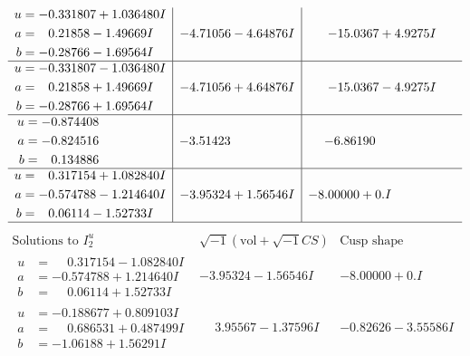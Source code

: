 \documentclass[1p]{elsarticle_modified}
\theoremstyle{definition}
\newcommand{\I}{\sqrt{-1}}
\begin{document}
$$\begin{array}{c|c|c}
\begin{aligned}
u &= -0.331807 + 1.036480 I \\
a &= \phantom{-}0.21858 - 1.49669 I \\
b &= -0.28766 - 1.69564 I\end{aligned}
 & -4.71056 - 4.64876 I & -15.0367 + 4.9275 I \\ \hline\begin{aligned}
u &= -0.331807 - 1.036480 I \\
a &= \phantom{-}0.21858 + 1.49669 I \\
b &= -0.28766 + 1.69564 I\end{aligned}
 & -4.71056 + 4.64876 I & -15.0367 - 4.9275 I \\ \hline\begin{aligned}
u &= -0.874408\phantom{ +0.000000I} \\
a &= -0.824516\phantom{ +0.000000I} \\
b &= \phantom{-}0.134886\phantom{ +0.000000I}\end{aligned}
 & -3.51423\phantom{ +0.000000I} & -6.86190\phantom{ +0.000000I} \\ \hline\begin{aligned}
u &= \phantom{-}0.317154 + 1.082840 I \\
a &= -0.574788 - 1.214640 I \\
b &= \phantom{-}0.06114 - 1.52733 I\end{aligned}
 & -3.95324 + 1.56546 I & -8.00000 + 0. I\phantom{ +0.000000I}\\
 \hline 
 \end{array}$$\newpage$$\begin{array}{c|c|c}  
\text{Solutions to }I^u_{2}& \I (\text{vol} + \sqrt{-1}CS) & \text{Cusp shape}\\
 \hline 
\begin{aligned}
u &= \phantom{-}0.317154 - 1.082840 I \\
a &= -0.574788 + 1.214640 I \\
b &= \phantom{-}0.06114 + 1.52733 I\end{aligned}
 & -3.95324 - 1.56546 I & -8.00000 + 0. I\phantom{ +0.000000I} \\ \hline\begin{aligned}
u &= -0.188677 + 0.809103 I \\
a &= \phantom{-}0.686531 + 0.487499 I \\
b &= -1.06188 + 1.56291 I\end{aligned}
 & \phantom{-}3.95567 - 1.37596 I & -0.82626 - 3.55586 I \\ \hline\begin{aligned}

\end{aligned}
\end{array}$$
\end{document}
